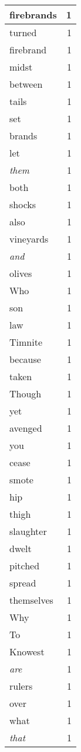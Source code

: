 \begin{center}
\begin{longtable}{l|r}
firebrands & 1\\ \hline 
turned & 1\\ \hline 
firebrand & 1\\ \hline 
midst & 1\\ \hline 
between & 1\\ \hline 
tails & 1\\ \hline 
set & 1\\ \hline 
brands & 1\\ \hline 
let & 1\\ \hline 
\emph{them} & 1\\ \hline 
both & 1\\ \hline 
shocks & 1\\ \hline 
also & 1\\ \hline 
vineyards & 1\\ \hline 
\emph{and} & 1\\ \hline 
olives & 1\\ \hline 
Who & 1\\ \hline 
son & 1\\ \hline 
law & 1\\ \hline 
Timnite & 1\\ \hline 
because & 1\\ \hline 
taken & 1\\ \hline 
Though & 1\\ \hline 
yet & 1\\ \hline 
avenged & 1\\ \hline 
you & 1\\ \hline 
cease & 1\\ \hline 
smote & 1\\ \hline 
hip & 1\\ \hline 
thigh & 1\\ \hline 
slaughter & 1\\ \hline 
dwelt & 1\\ \hline 
pitched & 1\\ \hline 
spread & 1\\ \hline 
themselves & 1\\ \hline 
Why & 1\\ \hline 
To & 1\\ \hline 
Knowest & 1\\ \hline 
\emph{are} & 1\\ \hline 
rulers & 1\\ \hline 
over & 1\\ \hline 
what & 1\\ \hline 
\emph{that} & 1\\ \hline 

\end{longtable}
\end{center}

